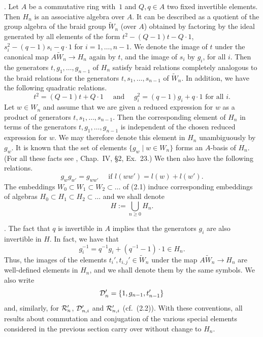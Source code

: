 . Let $A$ be a commutative ring with~$1$ and $Q,q \in A$ two
fixed invertible elements.  Then $H_n$  is an associative algebra over $A$. 
It can be described as a quotient of the
group algebra of the braid  group $\tilde{W}_n$ (over $A$) obtained by
factoring by the ideal generated  by all elements  of the form $t^2 
-(Q-1)t-Q \cdot 1$, $s_i^2-(q-1)s_i- q \cdot 1$ for $i=1,\ldots,n-1$.  We
denote the    image  of $t$  under the   canonical   map $A\tilde{W}_n
\rightarrow H_n$ again by  $t$, and the image of  $s_i$ by  $g_i$, for
all $i$. Then the generators  $t,g_1,\ldots,g_{n-1}$ of $H_n$  satisfy
braid  relations completely analogous to  the braid  relations for the
generators  $t,s_1,\ldots,s_{n-1}$ of   $\tilde{W}_n$.  In
addition, we have the following quadratic relations.
\[ t^2=(Q-1)t+Q \cdot 1  \quad \mbox{ and } \quad g_i^2=(q-1)g_i+q \cdot 1 
\mbox{ for all $i$}.\]
Let $w \in W_n$ and assume that we  are given a reduced expression for
$w$ as a  product    of generators $t,s_1,\ldots,s_{n-1}$.  Then   the
corresponding element      of $H_n$  in  terms     of  the  generators
$t,g_1,\ldots,g_{n-1}$ is independent of the chosen reduced expression
for $w$.  We may therefore  denote this element in $H_n$ unambiguously
by   $g_w$. It is  known that  the set  of elements $\{g_w  \mid w \in
W_n\}$  forms   an $A$-basis of   $H_n$.  (For   all these  facts see
\cite{Bour},  Chap.\  IV,  \S 2, Ex.\   23.)   We then also   have the
following relations.
\[ g_w g_{w'}=g_{ww'} \quad \mbox{ if $l(ww')=l(w)+l(w')$}.\]
The embeddings $W_0 \subset W_1 \subset W_2 \subset \ldots$ of (2.1)
induce corresponding embeddings of algebras $H_0 \subset H_1 \subset H_2 
\subset \ldots$ and we shall denote
\[ H:=\bigcup_{n \geq 0} H_n.\]

.  The fact that $q$ is invertible in $A$ implies that the generators
$g_i$ are also invertible in $H$. In fact, we have that
\[ g_i^{-1}=q^{-1}g_i+(q^{-1}-1) \cdot 1 \in H_n.\]
Thus, the images of the elements $t_i',t_{i,j}' \in \tilde{W}_n$ under
the map  $A\tilde{W}_n  \rightarrow H_n$ are  well-defined elements in
$H_n$, and we shall denote them by the same symbols. We also write
\[{\cal D}_n' = \{ 1,g_{n-1}, t_{n-1}' \}\]
and,   similarly, for  ${\cal   R}_n'$, ${\cal  D}_{n,i}'$ and  ${\cal
R}_{n,i}'$ (cf.\ (2.2)). With   these conventions, all results   about
commutation and conjugation of the various special elements considered
in the previous section carry over without change to $H_n$.

